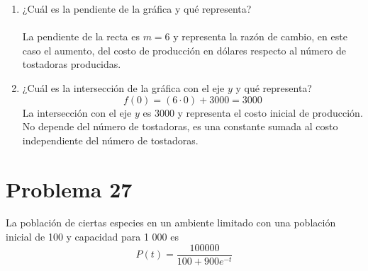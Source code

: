 \documentclass[12pt]{article}
\begin{document}
\begin{enumerate}
\item  ¿Cuál es la pendiente de la gráfica y qué representa?
\\ \\
La pendiente de la recta es $m=6$ y representa la razón de cambio, en este caso el aumento, del costo de producción en dólares respecto al número de tostadoras producidas.
\\  
\item  ¿Cuál es la intersección de la gráfica con el eje $y$ y qué representa?
\\
\[
f(0) = (6 \cdot 0) + 3000 = 3000
\]
La intersección con el eje $y$ es 3000 y representa el costo inicial de producción. No depende del número de tostadoras, es una constante sumada al costo independiente del número de tostadoras.
\\
\end{enumerate}

\clearpage
\section{Problema 27}
La población de ciertas especies en un ambiente limitado con una población inicial de 100 y capacidad para 1 000 es 
\[
P (t) = \frac{100 000}{100 + 900 e^{-t}} 
\]
\end{document}
